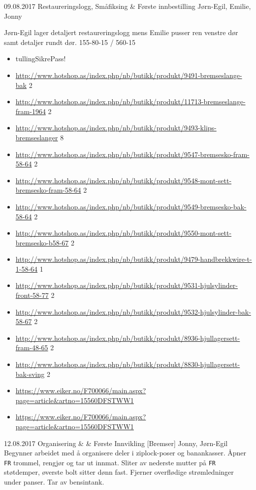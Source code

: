 \worklogitem
	{09.08.2017}
	{Restaureringslogg, Småfiksing \& Første innbestilling}
	{J\o rn-Egil, Emilie, Jonny}
	{J\o rn-Egil lager detaljert restaureringslogg mens Emilie pusser ren venstre d\o r samt detaljer rundt d\o r. 155-80-15 / 560-15
	\begin{itemize}

		\item tullingSikrePass!
		\item \url{http://www.hotshop.as/index.php/nb/butikk/produkt/9491-bremseslange-bak} 2
		\item \url{http://www.hotshop.as/index.php/nb/butikk/produkt/11713-bremseslange-fram-1964} 2
		\item \url{http://www.hotshop.as/index.php/nb/butikk/produkt/9493-klips-bremseslanger} 8
		\item \url{http://www.hotshop.as/index.php/nb/butikk/produkt/9547-bremsesko-fram-58-64} 2
		\item \url{http://www.hotshop.as/index.php/nb/butikk/produkt/9548-mont-sett-bremsesko-fram-58-64} 2
		\item \url{http://www.hotshop.as/index.php/nb/butikk/produkt/9549-bremsesko-bak-58-64} 2
		\item \url{http://www.hotshop.as/index.php/nb/butikk/produkt/9550-mont-sett-bremsesko-b58-67} 2
		\item \url{http://www.hotshop.as/index.php/nb/butikk/produkt/9479-handbrekkwire-t-1-58-64} 1
		\item \url{http://www.hotshop.as/index.php/nb/butikk/produkt/9531-hjulsylinder-front-58-77} 2
		\item \url{http://www.hotshop.as/index.php/nb/butikk/produkt/9532-hjulsylinder-bak-58-67} 2
		\item \url{http://www.hotshop.as/index.php/nb/butikk/produkt/8936-hjullagersett-fram-48-65} 2
		\item \url{http://www.hotshop.as/index.php/nb/butikk/produkt/8830-hjullagersett-bak-sving} 2

		\item \url{https://www.eiker.no/F700066/main.aspx?page=article&artno=15560DFSTWW1}
		\item \url{https://www.eiker.no/F700066/main.aspx?page=article&artno=15560DFSTWW1}
	\end{itemize}
	}


\worklogitem
	{12.08.2017}
	{Organisering & \& F\o rste Innvikling [Bremser]}
	{Jonny, J\o rn-Egil}
	{Begynner arbeidet med å organisere deler i ziplock-poser og banankasser. Åpner \texttt{FR} trommel, rengjør og tar ut innmat. Sliter av nederste mutter på \texttt{FR} støtdemper, øverste bolt sitter dønn fast. Fjerner overflødige strømledninger under panser. Tar av bensintank.}


